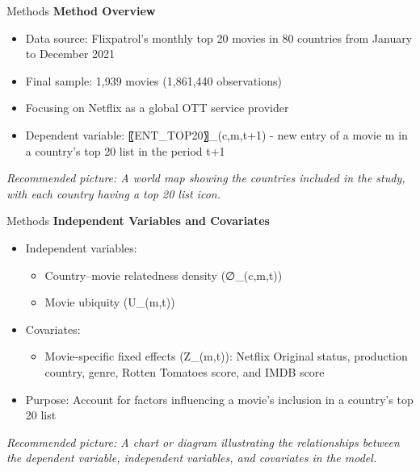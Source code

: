 \documentclass[
  ignorenonframetext,
]{beamer}
\providecommand{\tightlist}{%
  \setlength{\itemsep}{0pt}\setlength{\parskip}{0pt}}\usepackage{longtable,booktabs,array}
\begin{document}
\begin{frame}{Methods}
\protect\hypertarget{methods}{}
\textbf{Method Overview}

\begin{itemize}
\item
  Data source: Flixpatrol's monthly top 20 movies in 80 countries from
  January to December 2021
\item
  Final sample: 1,939 movies (1,861,440 observations)
\item
  Focusing on Netflix as a global OTT service provider
\item
  Dependent variable: 〖ENT\_TOP20〗\_(c,m,t+1) - new entry of a movie m
  in a country's top 20 list in the period t+1
\end{itemize}

\emph{Recommended picture: A world map showing the countries included in
the study, with each country having a top 20 list icon.}
\end{frame}

\begin{frame}{Methods}
\protect\hypertarget{methods-1}{}
\textbf{Independent Variables and Covariates}

\begin{itemize}
\item
  Independent variables:

  \begin{itemize}
  \item
    Country--movie relatedness density (∅\_(c,m,t))
  \item
    Movie ubiquity (U\_(m,t))
  \end{itemize}
\item
  Covariates:

  \begin{itemize}
  \tightlist
  \item
    Movie-specific fixed effects (Z\_(m,t)): Netflix Original status,
    production country, genre, Rotten Tomatoes score, and IMDB score
  \end{itemize}
\item
  Purpose: Account for factors influencing a movie's inclusion in a
  country's top 20 list
\end{itemize}

\emph{Recommended picture: A chart or diagram illustrating the
relationships between the dependent variable, independent variables, and
covariates in the model.}
\end{frame}
\end{document}
